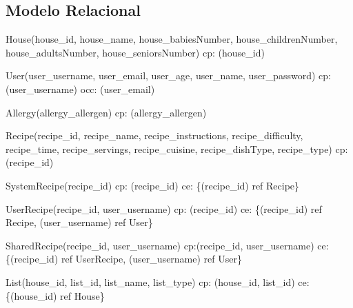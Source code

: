 \subsection{Modelo Relacional}\label{subsec312}

{\parindent 0pt
	\begin{description}
		\item House(house\_id, house\_name, house\_babiesNumber, house\_childrenNumber, house\_adultsNumber, house\_seniorsNumber) \newline
		\acrshort{cp}: (house\_id) 
		
		\item User(user\_username, user\_email, user\_age, user\_name, user\_password) \newline
		\acrshort{cp}: (user\_username)  \newline
		\acrshort{occ}: (user\_email)
		
		\item Allergy(allergy\_allergen) \newline
		\acrshort{cp}: (allergy\_allergen) 
		
		\item Recipe(recipe\_id, recipe\_name, recipe\_instructions, recipe\_difficulty, recipe\_time, recipe\_servings, recipe\_cuisine, recipe\_dishType, recipe\_type) \newline
		\acrshort{cp}: (recipe\_id) 
		
		\item SystemRecipe(recipe\_id) \newline
		\acrshort{cp}: (recipe\_id) \newline
		\acrshort{ce}: \{(recipe\_id) ref Recipe\}
		
		\item UserRecipe(recipe\_id, user\_username) \newline
		\acrshort{cp}: (recipe\_id) \newline
		\acrshort{ce}: \{(recipe\_id) ref Recipe, (user\_username) ref User\}
		
		\item SharedRecipe(recipe\_id, user\_username) \newline
		\acrshort{cp}:(recipe\_id, user\_username) \newline
		\acrshort{ce}: \{(recipe\_id) ref UserRecipe, (user\_username) ref User\}
		
		\item List(house\_id, list\_id, list\_name, list\_type) \newline
		\acrshort{cp}: (house\_id, list\_id) \newline
		\acrshort{ce}: \{(house\_id) ref House\}
		

\end{description}}
